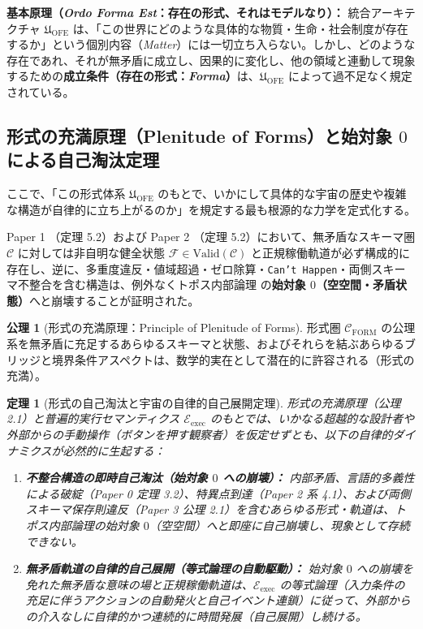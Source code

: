 \documentclass[11pt,a4paper]{ltjsarticle}
\theoremstyle{definition}
\newtheorem{axiom}{公理}[section]
\theoremstyle{plain}
\newtheorem{theorem}{定理}[section]
\begin{document}
\noindent\textbf{基本原理（\textit{Ordo Forma Est}：存在の形式、それはモデルなり）：}
統合アーキテクチャ $\mathfrak{U}_{\mathrm{OFE}}$ は、「この世界にどのような具体的な物質・生命・社会制度が存在するか」という個別内容（\textit{Matter}）には一切立ち入らない。しかし、どのような存在であれ、それが無矛盾に成立し、因果的に変化し、他の領域と連動して現象するための\textbf{成立条件（存在の形式：\textit{Forma}）}は、$\mathfrak{U}_{\mathrm{OFE}}$ によって過不足なく規定されている。

\subsection{形式の充満原理（Plenitude of Forms）と始対象 $0$ による自己淘汰定理}
ここで、「この形式体系 $\mathfrak{U}_{\mathrm{OFE}}$ のもとで、いかにして具体的な宇宙の歴史や複雑な構造が自律的に立ち上がるのか」を規定する最も根源的な力学を定式化する。

Paper 1 \cite{Ota2026_1}（定理 5.2）および Paper 2 \cite{Ota2026_2}（定理 5.2）において、無矛盾なスキーマ圏 $\mathcal{C}$ に対しては非自明な健全状態 $\mathcal{F} \in \mathrm{Valid}(\mathcal{C})$ と正規稼働軌道が必ず構成的に存在し、逆に、多重度違反・値域超過・ゼロ除算・\texttt{Can't Happen}・両側スキーマ不整合を含む構造は、例外なくトポス内部論理 \cite{MacLaneMoerdijk1992} の\textbf{始対象 $0$（空空間・矛盾状態）}へと崩壊することが証明された。

\begin{axiom}[形式の充満原理：Principle of Plenitude of Forms]
形式圏 $\mathcal{C}_{\mathrm{FORM}}$ の公理系を無矛盾に充足するあらゆるスキーマと状態、およびそれらを結ぶあらゆるブリッジと境界条件アスペクトは、数学的実在として潜在的に許容される（形式の充満）。
\end{axiom}

\begin{theorem}[形式の自己淘汰と宇宙の自律的自己展開定理]
形式の充満原理（公理 2.1）と普遍的実行セマンティクス $\mathcal{E}_{\mathrm{exec}}$ のもとでは、いかなる超越的な設計者や外部からの手動操作（ボタンを押す観察者）を仮定せずとも、以下の自律的ダイナミクスが必然的に生起する：
\begin{enumerate}
    \item \textbf{不整合構造の即時自己淘汰（始対象 $0$ への崩壊）：} 内部矛盾、言語的多義性による破綻（Paper 0 \cite{Ota2026_0} 定理 3.2）、特異点到達（Paper 2 \cite{Ota2026_2} 系 4.1）、および両側スキーマ保存則違反（Paper 3 \cite{Ota2026_3} 公理 2.1）を含むあらゆる形式・軌道は、トポス内部論理の始対象 $0$（空空間）へと即座に自己崩壊し、現象として存続できない。
    \item \textbf{無矛盾軌道の自律的自己展開（等式論理の自動駆動）：} 始対象 $0$ への崩壊を免れた無矛盾な意味の場と正規稼働軌道は、$\mathcal{E}_{\mathrm{exec}}$ の等式論理（入力条件の充足に伴うアクションの自動発火と自己イベント連鎖）に従って、外部からの介入なしに自律的かつ連続的に時間発展（自己展開）し続ける。
\end{enumerate}
\end{theorem}
\end{document}
